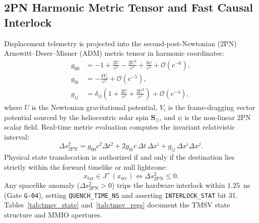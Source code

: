 \documentclass[11pt,onecolumn]{article}
\begin{document}
\subsection{2PN Harmonic Metric Tensor and Fast Causal Interlock}
Displacement telemetry is projected into the second-post-Newtonian (2PN) Arnowitt--Deser--Misner (ADM) metric tensor in harmonic coordinates:
\begin{align}
g_{00} &= -1 + \frac{2U}{c^2} - \frac{2U^2}{c^4} + \frac{3\psi}{c^4} + \mathcal{O}(c^{-6}), \label{eq:g00} \\
g_{0i} &= -\frac{4V_i}{c^3} + \mathcal{O}(c^{-5}), \label{eq:g0i} \\
g_{ij} &= \delta_{ij}\left(1 + \frac{2U}{c^2} + \frac{2U^2}{c^4}\right) + \mathcal{O}(c^{-4}), \label{eq:gij}
\end{align}
where $U$ is the Newtonian gravitational potential, $V_i$ is the frame-dragging vector potential sourced by the heliocentric solar spin $\mathbf{S}_\odot$, and $\psi$ is the non-linear 2PN scalar field. Real-time metric evaluation computes the invariant relativistic interval:
\begin{equation}
\Delta s^2_{\text{2PN}} = g_{00} c^2 \Delta t^2 + 2 g_{0i} c\,\Delta t\,\Delta x^i + g_{ij}\,\Delta x^i \Delta x^j.
\label{eq:ds2_interval}
\end{equation}
Physical state translocation is authorized if and only if the destination lies strictly within the forward timelike or null lightcone:
\begin{equation}
x_{\text{tar}} \in J^+(x_{\text{src}}) \iff \Delta s^2_{\text{2PN}} \le 0.
\end{equation}
Any spacelike anomaly ($\Delta s^2_{\text{2PN}} > 0$) trips the hardware interlock within $1.25$~ns (Gate \texttt{G-04}), setting \texttt{QUENCH\_TIME\_NS} and asserting \texttt{INTERLOCK\_STAT} bit 31. Tables~\ref{tab:tmsv_state} and~\ref{tab:tmsv_regs} document the TMSV state structure and MMIO apertures.
\end{document}
